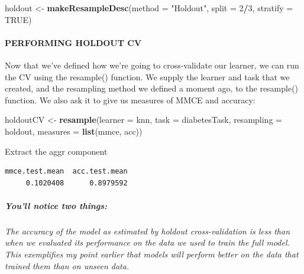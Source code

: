 \documentclass[
]{article}
\newenvironment{Shaded}{\begin{snugshade}}{\end{snugshade}}
\newcommand{\AttributeTok}[1]{\textcolor[rgb]{0.13,0.29,0.53}{#1}}
\newcommand{\ConstantTok}[1]{\textcolor[rgb]{0.56,0.35,0.01}{#1}}
\newcommand{\DecValTok}[1]{\textcolor[rgb]{0.00,0.00,0.81}{#1}}
\newcommand{\FunctionTok}[1]{\textcolor[rgb]{0.13,0.29,0.53}{\textbf{#1}}}
\newcommand{\NormalTok}[1]{#1}
\newcommand{\OtherTok}[1]{\textcolor[rgb]{0.56,0.35,0.01}{#1}}
\newcommand{\SpecialCharTok}[1]{\textcolor[rgb]{0.81,0.36,0.00}{\textbf{#1}}}
\newcommand{\StringTok}[1]{\textcolor[rgb]{0.31,0.60,0.02}{#1}}
\begin{document}
\begin{Shaded}
\begin{Highlighting}[]
\NormalTok{holdout }\OtherTok{\textless{}{-}} \FunctionTok{makeResampleDesc}\NormalTok{(}\AttributeTok{method =} \StringTok{"Holdout"}\NormalTok{, }\AttributeTok{split =} \DecValTok{2}\SpecialCharTok{/}\DecValTok{3}\NormalTok{,}
                            \AttributeTok{stratify =} \ConstantTok{TRUE}\NormalTok{)}
\end{Highlighting}
\end{Shaded}

\paragraph{PERFORMING HOLDOUT CV}\label{performing-holdout-cv}

Now that we've defined how we're going to cross-validate our learner, we
can run the CV using the resample() function. We supply the learner and
task that we created, and the resampling method we defined a moment ago,
to the resample() function. We also ask it to give us measures of MMCE
and accuracy:

\begin{Shaded}
\begin{Highlighting}[]
\NormalTok{holdoutCV }\OtherTok{\textless{}{-}} \FunctionTok{resample}\NormalTok{(}\AttributeTok{learner =}\NormalTok{ knn, }\AttributeTok{task =}\NormalTok{ diabetesTask,}
                      \AttributeTok{resampling =}\NormalTok{ holdout, }\AttributeTok{measures =} \FunctionTok{list}\NormalTok{(mmce, acc))}
\end{Highlighting}
\end{Shaded}

Extract the aggr component

\begin{Shaded}
\end{Shaded}

\begin{verbatim}
mmce.test.mean  acc.test.mean 
     0.1020408      0.8979592 
\end{verbatim}

\subparagraph{You'll notice two things:}\label{youll-notice-two-things}

\emph{The accuracy of the model as estimated by holdout cross-validation
is less than when we evaluated its performance on the data we used to
train the full model. This exemplifies my point earlier that models will
perform better on the data that trained them than on unseen data.}
\end{document}
